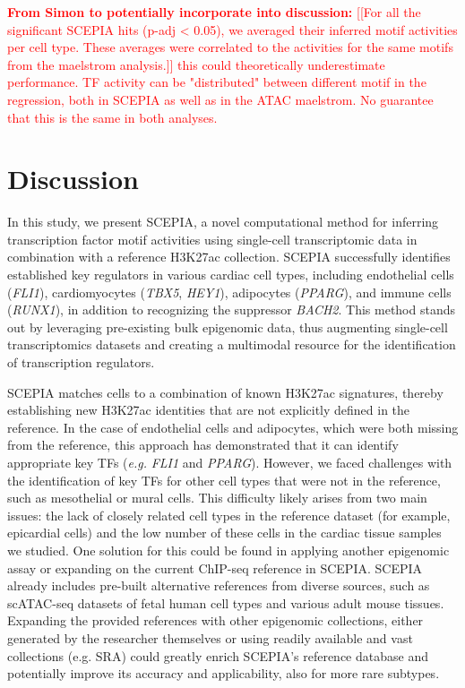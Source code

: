 \textcolor{red}{\textbf{From Simon to potentially incorporate into discussion:} 
[[For all the significant SCEPIA hits (p-adj < 0.05), we averaged their inferred motif activities per cell type. These averages were correlated to the activities for the same motifs from the maelstrom analysis.]] 
this could theoretically underestimate performance. TF activity can be "distributed" between different motif in the regression, both in SCEPIA as well as in the ATAC maelstrom. No guarantee that this is the same in both analyses. }

\section{Discussion}

In this study, we present SCEPIA, a novel computational method for inferring transcription factor motif activities using single-cell transcriptomic data in combination with a reference H3K27ac collection. SCEPIA successfully identifies established key regulators in various cardiac cell types, including endothelial cells (\textit{FLI1}), cardiomyocytes (\textit{TBX5}, \textit{HEY1}), adipocytes (\textit{PPARG}), and immune cells (\textit{RUNX1}), in addition to recognizing the suppressor \textit{BACH2}. This method stands out by leveraging pre-existing bulk epigenomic data, thus augmenting single-cell transcriptomics datasets and creating a multimodal resource for the identification of transcription regulators.

SCEPIA matches cells to a combination of known H3K27ac signatures, thereby establishing new H3K27ac identities that are not explicitly defined in the reference. In the case of endothelial cells and adipocytes, which were both missing from the reference, this approach has demonstrated that it can identify appropriate key TFs (\textit{e.g.} \textit{FLI1} and \textit{PPARG}). However, we faced challenges with the identification of key TFs for other cell types that were not in the reference, such as mesothelial or mural cells. This difficulty likely arises from two main issues: the lack of closely related cell types in the reference dataset (for example, epicardial cells) and the low number of these cells in the cardiac tissue samples we studied. One solution for this could be found in applying another epigenomic assay or expanding on the current ChIP-seq reference in SCEPIA. SCEPIA already includes pre-built alternative references from diverse sources, such as scATAC-seq datasets of fetal human cell types\cite{Domcke2020} and various adult mouse tissues\cite{Cusanovich2018}. Expanding the provided references with other epigenomic collections, either generated by the researcher themselves or using readily available and vast collections (e.g. SRA) could greatly enrich SCEPIA's reference database and potentially improve its accuracy and applicability, also for more rare subtypes. 

